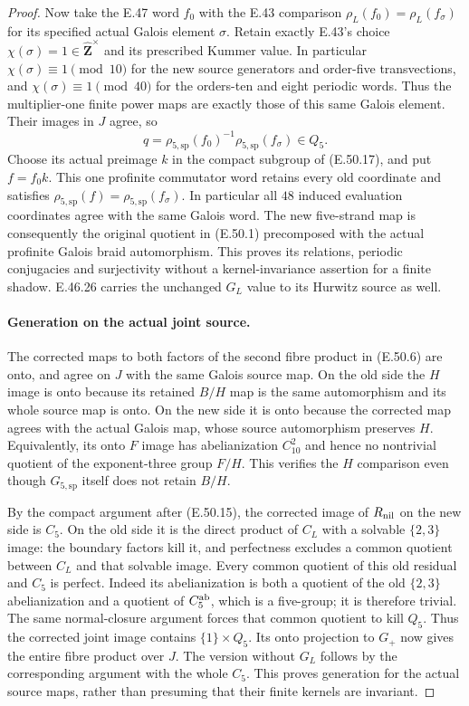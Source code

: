 \begin{proof}
Now take the E.47 word $f_0$ with the E.43
comparison
$\rho_L(f_0)=\rho_L(f_\sigma)$ for its
specified actual Galois element $\sigma$.
Retain exactly E.43's choice
$\chi(\sigma)=1\in\widehat{\mathbf Z}^{\times}$
and its prescribed Kummer value.  In particular
$\chi(\sigma)\equiv1\pmod{10}$ for the new
source generators and order-five transvections,
and $\chi(\sigma)\equiv1\pmod{40}$ for the
orders-ten and eight periodic words.
Thus the multiplier-one finite power maps
are exactly those of this same Galois element.
Their images in $J$ agree, so
\[
       q=\rho_{5,\mathrm{sp}}(f_0)^{-1}
                   \rho_{5,\mathrm{sp}}(f_\sigma)\in Q_5.
 \tag{E.50.18}
\]
Choose its actual preimage $k$ in the
compact subgroup of \textup{(E.50.17)},
and put $f=f_0k$.
This one profinite commutator word retains
every old coordinate and satisfies
$\rho_{5,\mathrm{sp}}(f)=
\rho_{5,\mathrm{sp}}(f_\sigma)$.
In particular all $48$ induced evaluation
coordinates agree with the same Galois word.
The new five-strand map is consequently
the original quotient in
\textup{(E.50.1)} precomposed with the
actual profinite Galois braid automorphism.
This proves its relations, periodic
conjugacies and surjectivity without a
kernel-invariance assertion for a finite
shadow.  E.46.26 carries the unchanged
$G_L$ value to its Hurwitz source as well.

\paragraph{Generation on the actual joint source.}
The corrected maps to both factors of
the second fibre product in
\textup{(E.50.6)} are onto, and agree
on $J$ with the same Galois source map.
On the old side the $H$ image is onto
because its retained $B/H$ map is the
same automorphism and its whole source
map is onto.  On the new side it is onto
because the corrected map agrees with
the actual Galois map, whose source
automorphism preserves $H$.
Equivalently, its onto $F$ image has
abelianization $C_{10}^2$ and hence no
nontrivial quotient of the exponent-three
group $F/H$.
This verifies the $H$ comparison even
though $G_{5,\mathrm{sp}}$ itself does
not retain $B/H$.

By the compact argument after
\textup{(E.50.15)}, the corrected image
of $R_{\rm nil}$ on the new side is
$C_5$.  On the old side it is the direct
product of $C_L$ with a solvable
$\{2,3\}$ image: the boundary factors
kill it, and perfectness excludes a
common quotient between $C_L$ and
that solvable image.
Every common quotient of this old
residual and $C_5$ is perfect.  Indeed
its abelianization is both a quotient
of the old $\{2,3\}$ abelianization
and a quotient of $C_5^{\rm ab}$,
which is a five-group; it is therefore
trivial.  The same normal-closure
argument forces that common quotient
to kill $Q_5$.
Thus the corrected joint image contains
$\{1\}\times Q_5$.
Its onto projection to $G_+$ now gives
the entire fibre product over $J$.
The version without $G_L$ follows by
the corresponding argument with the
whole $C_5$.
This proves generation for the actual
source maps, rather than presuming
that their finite kernels are invariant.


\end{proof}
